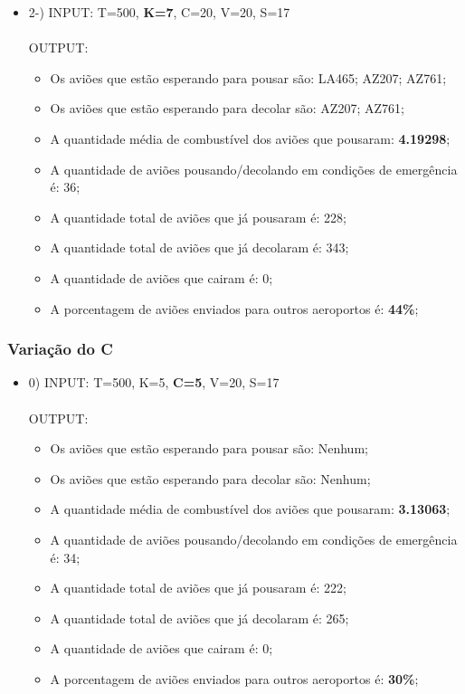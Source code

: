 \documentclass{article}
\begin{document}
\hline

\begin{itemize}
   \item 2-) INPUT: T=500, \textbf{K=7}, C=20, V=20, S=17\\\\
   OUTPUT: 
   \begin{itemize}
      \item Os aviões que estão esperando para pousar são: LA465; AZ207; AZ761;
      \item Os aviões que estão esperando para decolar são: AZ207; AZ761;
      \item A quantidade média de combustível dos aviões que pousaram: \textbf{4.19298};
      \item A quantidade de aviões pousando/decolando em condições de emergência é: 36;
      \item A quantidade total de aviões que já pousaram é: 228;
      \item A quantidade total de aviões que já decolaram é: 343;
      \item A quantidade de aviões que cairam é: 0;
      \item A porcentagem de aviões enviados para outros aeroportos é: \textbf{44\%};
   \end{itemize}
\end{itemize}

\hline

\subsubsection{Variação do C}

\begin{itemize}
   \item 0) INPUT: T=500, K=5, \textbf{C=5}, V=20, S=17 \\\\
   OUTPUT: 
   \begin{itemize}
      \item Os aviões que estão esperando para pousar são: Nenhum;
      \item Os aviões que estão esperando para decolar são: Nenhum;
      \item A quantidade média de combustível dos aviões que pousaram: \textbf{3.13063};
      \item A quantidade de aviões pousando/decolando em condições de emergência é: 34;
      \item A quantidade total de aviões que já pousaram é: 222;
      \item A quantidade total de aviões que já decolaram é: 265;
      \item A quantidade de aviões que cairam é: 0;
      \item A porcentagem de aviões enviados para outros aeroportos é: \textbf{30\%};
   \end{itemize}
\end{itemize}
\end{document}
